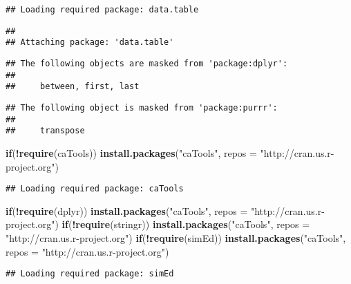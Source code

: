 \documentclass[]{article}
\newenvironment{Shaded}{\begin{snugshade}}{\end{snugshade}}
\newcommand{\KeywordTok}[1]{\textcolor[rgb]{0.13,0.29,0.53}{\textbf{#1}}}
\newcommand{\DataTypeTok}[1]{\textcolor[rgb]{0.13,0.29,0.53}{#1}}
\newcommand{\StringTok}[1]{\textcolor[rgb]{0.31,0.60,0.02}{#1}}
\newcommand{\ControlFlowTok}[1]{\textcolor[rgb]{0.13,0.29,0.53}{\textbf{#1}}}
\newcommand{\OperatorTok}[1]{\textcolor[rgb]{0.81,0.36,0.00}{\textbf{#1}}}
\newcommand{\NormalTok}[1]{#1}
\begin{document}
\begin{verbatim}
## Loading required package: data.table
\end{verbatim}

\begin{verbatim}
## 
## Attaching package: 'data.table'
\end{verbatim}

\begin{verbatim}
## The following objects are masked from 'package:dplyr':
## 
##     between, first, last
\end{verbatim}

\begin{verbatim}
## The following object is masked from 'package:purrr':
## 
##     transpose
\end{verbatim}

\begin{Shaded}
\begin{Highlighting}[]
\ControlFlowTok{if}\NormalTok{(}\OperatorTok{!}\KeywordTok{require}\NormalTok{(caTools)) }\KeywordTok{install.packages}\NormalTok{(}\StringTok{"caTools"}\NormalTok{, }\DataTypeTok{repos =} \StringTok{"http://cran.us.r-project.org"}\NormalTok{)}
\end{Highlighting}
\end{Shaded}

\begin{verbatim}
## Loading required package: caTools
\end{verbatim}

\begin{Shaded}
\begin{Highlighting}[]
\ControlFlowTok{if}\NormalTok{(}\OperatorTok{!}\KeywordTok{require}\NormalTok{(dplyr)) }\KeywordTok{install.packages}\NormalTok{(}\StringTok{"caTools"}\NormalTok{, }\DataTypeTok{repos =} \StringTok{"http://cran.us.r-project.org"}\NormalTok{)}
\ControlFlowTok{if}\NormalTok{(}\OperatorTok{!}\KeywordTok{require}\NormalTok{(stringr)) }\KeywordTok{install.packages}\NormalTok{(}\StringTok{"caTools"}\NormalTok{, }\DataTypeTok{repos =} \StringTok{"http://cran.us.r-project.org"}\NormalTok{)}
\ControlFlowTok{if}\NormalTok{(}\OperatorTok{!}\KeywordTok{require}\NormalTok{(simEd)) }\KeywordTok{install.packages}\NormalTok{(}\StringTok{"caTools"}\NormalTok{, }\DataTypeTok{repos =} \StringTok{"http://cran.us.r-project.org"}\NormalTok{)}
\end{Highlighting}
\end{Shaded}

\begin{verbatim}
## Loading required package: simEd
\end{verbatim}
\end{document}

